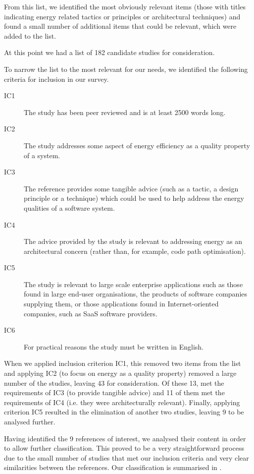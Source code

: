 From this list, we identified the most obviously relevant items (those with titles indicating energy related tactics or principles or architectural techniques) and found a small number of additional items that could be relevant, which were added to the list.

At this point we had a list of 182 candidate studies for consideration.

To narrow the list to the most relevant for our needs, we identified the following criteria for inclusion in our survey.

\begin{description}
	\item[IC1] The study has been peer reviewed and is at least 2500 words long.
	\item[IC2] The study addresses some aspect of energy efficiency as a quality property of a system.
	\item[IC3] The reference provides some tangible advice (such as a tactic, a design principle or a technique) which could be used to help address the energy qualities of a software system.
	\item[IC4] The advice provided by the study is relevant to addressing energy as an architectural concern (rather than, for example, code path optimisation).
	\item[IC5] The study is relevant to large scale enterprise applications such as those found in large end-user organisations, the products of software companies supplying them, or those applications found in Internet-oriented companies, such as SaaS software providers.
	\item[IC6] For practical reasons the study must be written in English.
\end{description}

When we applied inclusion criterion IC1, this removed two items from the list and applying IC2 (to focus on energy as a quality property) removed a large number of the studies, leaving 43 for consideration.  Of these 13, met the requirements of IC3 (to provide tangible advice) and 11 of them met the requirements of IC4 (i.e. they were architecturally relevant).  Finally, applying criterion IC5 resulted in the elimination of another two studies, leaving 9 to be analysed further.

Having identified the 9 references of interest, we analysed their content in order to allow further classification.  This proved to be a very straightforward process due to the small number of studies that met our inclusion criteria and very clear similarities between the references.  Our classification is summarised in .

